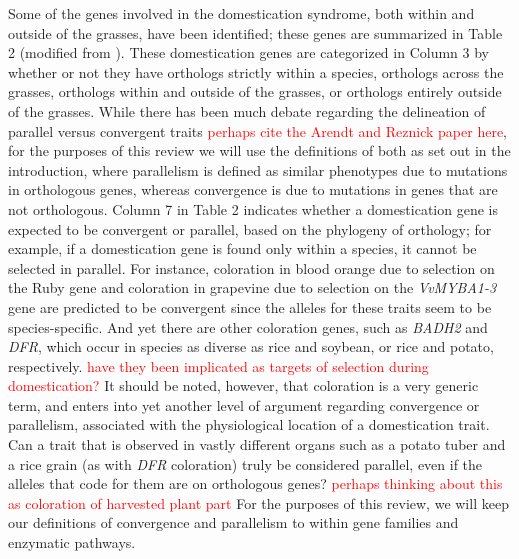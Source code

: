 \documentclass[12pt]{article}
\newcommand{\mbh}[1]{\textcolor{red}{\normalsize  #1}}
\begin{document}
Some of the genes involved in the domestication syndrome, both within and outside of the grasses, have been identified; these genes are summarized in Table 2 (modified from \citep{Lenser2013}).
These domestication genes are categorized in Column 3 by whether or not they have orthologs strictly within a species, orthologs across the grasses, orthologs within and outside of the grasses, or orthologs entirely outside of the grasses.
While there has been much debate regarding the delineation of parallel versus convergent traits \mbh{perhaps cite the Arendt and Reznick paper here}, for the purposes of this review we will use the definitions of both as set out in the introduction, where parallelism is defined as similar phenotypes due to mutations in orthologous genes, whereas convergence is due to mutations in genes that are not orthologous.
Column 7 in Table 2 indicates whether a domestication gene is expected to be convergent or parallel, based on the phylogeny of orthology; for example, if a domestication gene is found only within a species, it cannot be selected in parallel.
For instance, coloration in blood orange due to selection on the Ruby gene and coloration in grapevine due to selection on the \textit{VvMYBA1-3} gene are predicted to be convergent since the alleles for these traits seem to be species-specific.
And yet there are other coloration genes, such as \textit{BADH2} and \textit{DFR}, which occur in species as diverse as rice and soybean, or rice and potato, respectively. \mbh{have they been implicated as targets of selection during domestication?}
It should be noted, however, that coloration is a very generic term, and enters into yet another level of argument regarding convergence or parallelism, associated with the physiological location of a domestication trait.
Can a trait that is observed in vastly different organs such as a potato tuber and a rice grain (as with \textit{DFR} coloration) truly be considered parallel, even if the alleles that code for them are on orthologous genes? \mbh{perhaps thinking about this as coloration of harvested plant part}
For the purposes of this review, we will keep our definitions of convergence and parallelism to within gene families and enzymatic pathways. 
\end{document}

